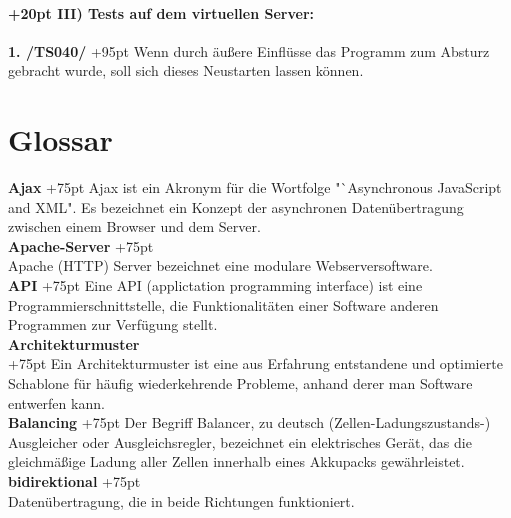 \documentclass[fontsize = 12pt, paper = a4]{scrreprt}
\begin{document}
\subsubsection*{
\hangindent+20pt 
III) Tests auf dem virtuellen Server:}

\textbf{1. /TS040/}
\hangindent+95pt 
\hspace*{6mm}
Wenn durch äußere Einflüsse das Programm zum Absturz gebracht wurde, soll sich dieses Neustarten lassen können.

\chapter*{Glossar}

\textbf{Ajax}
\hangindent+75pt 
\hspace*{13.5mm}
Ajax ist ein Akronym für die Wortfolge "`Asynchronous JavaScript and XML". Es bezeichnet ein Konzept der asynchronen Datenübertragung zwischen einem Browser und dem Server.\\

\textbf{Apache-Server}
\hangindent+75pt 
\\
Apache (HTTP) Server bezeichnet eine modulare Webserversoftware.\\

\textbf{API}
\hangindent+75pt 
\hspace*{13.5mm}
Eine API (applictation programming interface) ist eine Programmierschnittstelle, die Funktionalitäten einer Software anderen Programmen zur Verfügung stellt.\\

\textbf{Architekturmuster} \\
\hangindent+75pt  
Ein Architekturmuster ist eine aus Erfahrung entstandene und optimierte Schablone für häufig wiederkehrende Probleme, anhand derer man Software entwerfen kann.\\

\textbf{Balancing}
\hangindent+75pt 
\hspace*{3.5mm}
Der Begriff Balancer, zu deutsch (Zellen-Ladungszustands-) Ausgleicher oder Ausgleichsregler, bezeichnet ein elektrisches Gerät, das die gleichmäßige Ladung aller Zellen innerhalb eines Akkupacks gewährleistet.\\

\textbf{bidirektional}
\hangindent+75pt  \\
Datenübertragung, die in beide Richtungen funktioniert. \\
\end{document}
